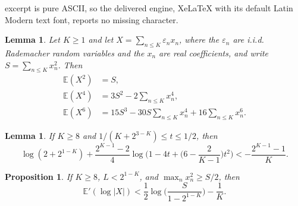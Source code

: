 \documentclass[10pt,a4paper]{amsart}
\newtheorem{lemma}[theorem]{Lemma}
\newtheorem{proposition}[theorem]{Proposition}
\newcommand{\EE}{\mathbb{E}}
\begin{document}
excerpt is pure ASCII, so the delivered engine, XeLaTeX with its default Latin Modern text font, reports no missing character.
\begin{lemma}\label{lemma moments}
Let $K\geq 1$ and let $X = \sum_{n\leq K} \varepsilon_n x_n$, where the $\varepsilon_n$ are i.i.d. Rademacher random variables and the $x_n$ are real coefficients, and write $S=\sum_{n\leq K}x_n^2$. Then
\begin{align*}
\EE(X^2)&=S,\\
\EE(X^4)&=3S^2-2\sum_{n\leq K}x_n^4,\\
\EE(X^6)&=15S^3-30S\sum_{n\leq K}x_n^4+16\sum_{n\leq K}x_n^6.
\end{align*}
\end{lemma}

\begin{lemma}\label{lemma scalar comparison}
If $K\geq 8$ and $1/(K+2^{3-K})\leq t\leq1/2$, then
$$ \log(2+2^{1-K})+\frac{2^{K-1}-2}{4} \log\bigg(1-4t+\bigg(6-\frac2{K-1}\bigg)t^2\bigg) < -\frac{2^{K-1}-1}{K}. $$
\end{lemma}

\begin{proposition}\label{prop large coordinate}
If $K\geq 8$, $L<2^{1-K}$, and $\max_nx_n^2\geq S/2$, then
$$ \EE'(\log|X|) < \frac{1}{2}\log\bigg(\frac{S}{1-2^{1-K}}\bigg)-\frac{1}{K}. $$
\end{proposition}
\end{document}
